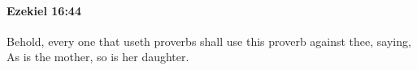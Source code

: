 
		\paragraph{Ezekiel 16:44} %
			\label{EZEKIEL-16-44}

			Behold, every one that useth proverbs shall use this proverb against thee, saying, As is the mother, so is her daughter.


